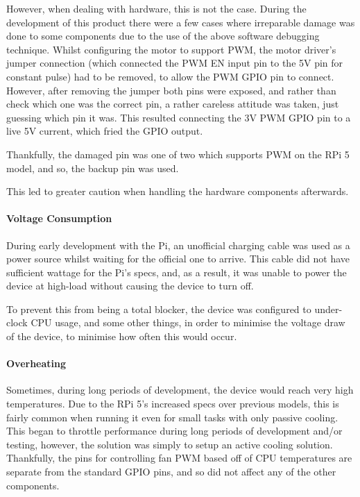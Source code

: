                     However, when dealing with hardware, this is not the case. During the development of this product there were a few cases where irreparable damage was done to some components due to the use of the above software debugging technique. Whilst configuring the motor to support PWM, the motor driver's jumper connection (which connected the PWM EN input pin to the 5V pin for constant pulse) had to be removed, to allow the PWM GPIO pin to connect. However, after removing the jumper both pins were exposed, and rather than check which one was the correct pin, a rather careless attitude was taken, just guessing which pin it was. This resulted connecting the 3V PWM GPIO pin to a live 5V current, which fried the GPIO output.
    
                    Thankfully, the damaged pin was one of two which supports PWM on the RPi 5 model, and so, the backup pin was used.
    
                    This led to greater caution when handling the hardware components afterwards.
    
                \paragraph{Voltage Consumption}
    
                    During early development with the Pi, an unofficial charging cable was used as a power source whilst waiting for the official one to arrive. This cable did not have sufficient wattage for the Pi's specs, and, as a result, it was unable to power the device at high-load without causing the device to turn off.
    
                    To prevent this from being a total blocker, the device was configured to under-clock CPU usage, and some other things, in order to minimise the voltage draw of the device, to minimise how often this would occur.
    
                \paragraph{Overheating}
    
                    Sometimes, during long periods of development, the device would reach very high temperatures. Due to the RPi 5's increased specs over previous models, this is fairly common when running it even for small tasks with only passive cooling. This began to throttle performance during long periods of development and/or testing, however, the solution was simply to setup an active cooling solution. Thankfully, the pins for controlling fan PWM based off of CPU temperatures are separate from the standard GPIO pins, and so did not affect any of the other components.
    
